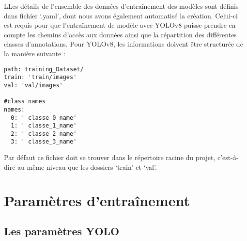 \documentclass[12pt,twoside]{book}
\begin{document}
LLes détails de l'ensemble des données d’entraînement des modèles sont définis dans fichier ‘.yaml’, dont nous avons également automatisé la création. Celui-ci est requis pour que l’entraînement de modèle avec YOLOv8 puisse prendre en compte les chemins d’accès aux données ainsi que la répartition des différentes classes d’annotations. Pour YOLOv8, les informations doivent être structurée de la manière suivante :
\begin{center}
\begin{verbatim}
path: training_Dataset/
train: 'train/images'
val: 'val/images'

#class names
names:
  0: ' classe_0_name'
  1: ' classe_1_name'
  2: ' classe_2_name'  
  3: ' classe_3_name'

\end{verbatim}    
\end{center}

\newpage
Par défaut ce fichier doit se trouver dans le répertoire racine du projet, c’est-à-dire au même niveau que les dossiers ‘train’ et ‘val’.

\section{Paramètres d'entraînement}
\subsection{Les paramètres YOLO}
\end{document}
